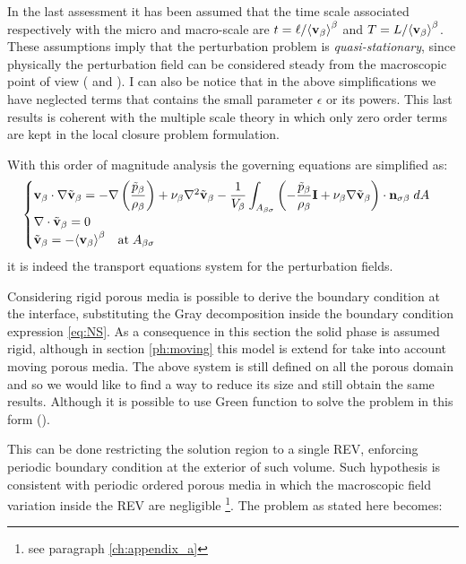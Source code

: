 In the last assessment it has been assumed that the time scale associated respectively with the micro and macro-scale are $t = \ell/{\left< \textbf{v}_{\beta} \right>}^{\beta}$ and $T =L/{\left< \textbf{v}_{\beta} \right>}^{\beta}$.
These assumptions imply that the perturbation problem is \textit{quasi-stationary}, since physically the perturbation field can be considered steady from the macroscopic point of view (\citet{davit2013homogenization} and \citet{zhu2014study}).
I can also be notice that in the above simplifications we have neglected terms that contains the small parameter $\epsilon$ or its powers. This last results is coherent with the multiple scale theory in which only zero order terms are kept in the local closure problem formulation.

With this order of magnitude analysis the governing equations are simplified as:
\begin{eqnarray}
	\begin{cases}
		\textbf{v}_{\beta} \cdot \nabla \tilde{\textbf{v}}_{\beta} = -\nabla \left(\dfrac{\tilde{p}_{\beta}}{\rho_{\beta}}\right) + \nu_{\beta} \nabla^2 \tilde{\textbf{v}}_{\beta} - \dfrac{1}{V_\beta} \displaystyle \int_{A_{\beta \sigma}} \left(-\dfrac{\tilde{p}_{\beta}}{\rho_{\beta}} \mathbf{I}  + \nu_{\beta} \nabla \tilde{\textbf{v}}_{\beta} \right) \cdot \mathbf{n}_{\sigma \beta} \;dA  \\
		\nabla \cdot \tilde{\textbf{v}}_{\beta} = 0  \\
		\tilde{\textbf{v}}_{\beta} = -{\left< \textbf{v}_{\beta} \right>}^{\beta} \quad \textrm{at} \; A_{\beta \sigma}
	\end{cases}
\label{eq:vans_mom_}
\end{eqnarray}
it is indeed the transport equations system for the perturbation fields.

Considering rigid porous media is possible to derive the boundary condition at the interface, substituting the Gray decomposition inside the boundary condition expression \eqref{eq:NS}. As a consequence in this section the solid phase is assumed rigid, although in section \ref{ph:moving} this model is extend for take into account moving porous media.
The above system is still defined on all the porous domain and so we would like to find a way to reduce its size and still obtain the same results.
Although it is possible to use Green function to solve the problem in this form (\citet{wood2013volume}).

This can be done restricting the solution region to a single REV, enforcing periodic boundary condition at the exterior of such volume.
Such hypothesis is consistent with periodic ordered porous media in which the macroscopic field variation inside the REV are negligible \footnote{see paragraph \ref{ch:appendix_a}}.
The problem as stated here becomes:


